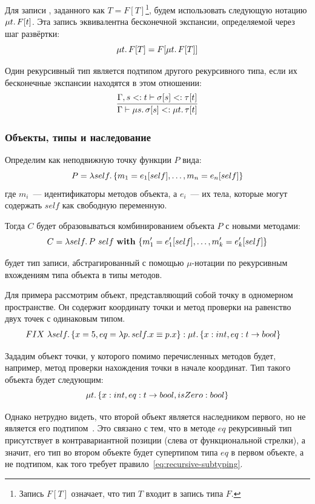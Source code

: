 Для записи , заданного как $T = F[T]$\footnote{Запись $F[T]$ означает, что тип $T$ входит в запись типа $F$.}, будем использовать следующую нотацию $\mu t\ldotp F[t]$.
Эта запись эквивалентна бесконечной экспансии, определяемой через шаг развёртки:
\[\mu t\ldotp F[T] = F[\mu t\ldotp F[T]]\]

Один рекурсивный тип является подтипом другого рекурсивного типа, если их бесконечные экспансии находятся в этом отношении:
\begin{equation}
    \label{eq:recursive-subtyping}
    \infer{
        \Gamma \vdash \mu s\ldotp \sigma[s] <: \mu t\ldotp \tau[t]
    }{
        \Gamma, s <: t \vdash \sigma[s] <: \tau[t]
    }
\end{equation}

\subsubsection{Объекты, типы и наследование}

Определим  как неподвижную точку функции $P$ вида:
\[
    P = \lambda self \ldotp \{m_1 = e_1[self], \ldots, m_n = e_n[self]\}
\]
где $m_i$~--- идентификаторы методов объекта, а $e_i$~--- их тела, которые могут содержать $self$ как свободную переменную.

Тогда  $C$ будет образовываться комбинированием объекта $P$ с новыми методами:
\[
    C = \lambda self \ldotp P~self~\mathbf{with}~\{m_1' = e_1'[self], \ldots, m_k' = e_k'[self]\}
\]

 будет тип записи, абстрагированный с помощью $\mu$-нотации по рекурсивным вхождениям типа объекта в типы методов.

Для примера рассмотрим объект, представляющий собой точку в одномерном пространстве.
Он содержит координату точки и метод проверки на равенство двух точек с одинаковым типом.
\begin{align*}
    FIX~ \lambda self \ldotp \{ &x = 5, eq = \lambda p \ldotp self.x \equiv p.x \}
    :
    \mu t \ldotp \{ x : int, eq : t \to bool \}
\end{align*}

Зададим объект точки, у которого помимо перечисленных методов будет, например, метод проверки нахождения точки в начале координат.
Тип такого объекта будет следующим:
\[
    \mu t \ldotp \{ x : int, eq : t \to bool, isZero : bool \}
\]

Однако нетрудно видеть, что второй объект является наследником первого, но не является его подтипом~\cite{cook1989inheritance}.
Это связано с тем, что в методе $eq$ рекурсивный тип присутствует в контравариантной позиции (слева от функциональной стрелки), а значит, его тип во втором объекте будет супертипом типа $eq$ в первом объекте, а не подтипом, как того требует правило~\eqref{eq:recursive-subtyping}.


